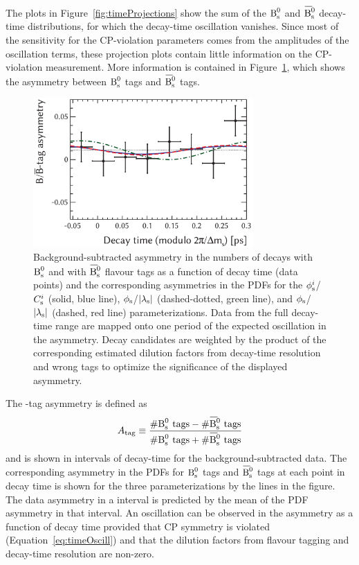 The plots in Figure~\ref{fig:timeProjections} show the sum of the $\text{B}_\text{s}^\text{0}$ and $\Bsbar$ decay-time distributions, for which the decay-time
oscillation vanishes. Since most of the sensitivity for the CP-violation parameters comes from the amplitudes of the oscillation terms,
these projection plots contain little information on the CP-violation measurement. More information is contained in
Figure~\ref{fig:BBbarAsymmetry}, which shows the asymmetry between $\text{B}_\text{s}^\text{0}$ tags and $\Bsbar$ tags.
\begin{figure}[htb]
  \centering
  \includegraphics[width=0.75\textwidth]{graphics/results/asym}
  \caption{Background-subtracted asymmetry in the numbers of decays with $\text{B}_\text{s}^\text{0}$ and with $\Bsbar$ flavour tags as a function of decay time
           (data points) and the corresponding asymmetries in the PDFs for the $\phi_\text{s}^{i}$/$C_\text{s}^{i}$ (solid, blue line),
           $\phi_\text{s}$/$|{\lambda_{\text{s}}}|$ (dashed-dotted, green line), and $\phi_\text{s}$/$|{\lambda_{\text{s}}}|$ (dashed, red line) parameterizations.
           Data from the full decay-time range are mapped onto one period of the expected oscillation in the asymmetry.
           Decay candidates are weighted by the product of the corresponding estimated dilution factors from decay-time resolution
           and wrong tags to optimize the significance of the displayed asymmetry.}
  \label{fig:BBbarAsymmetry}
\end{figure}

The \BsBsbar-tag asymmetry is defined as
\[
  A_{\text{tag}} \equiv \frac{\#\Bs{}\text{ tags} - \#\Bsbar{}\text{ tags}}{\#\Bs{}\text{ tags} + \#\Bsbar{}\text{ tags}}
\]
and is shown in intervals of decay-time for the background-subtracted data. The corresponding asymmetry in the PDFs for $\text{B}_\text{s}^\text{0}$ tags and
$\Bsbar$ tags at each point in decay time is shown for the three parameterizations by the lines in the figure. The data asymmetry in a
interval is predicted by the mean of the PDF asymmetry in that interval. An oscillation can be observed in the asymmetry as a function of
decay time provided that CP symmetry is violated (Equation~\ref{eq:timeOscill}) and that the dilution factors from flavour tagging and
decay-time resolution are non-zero.

